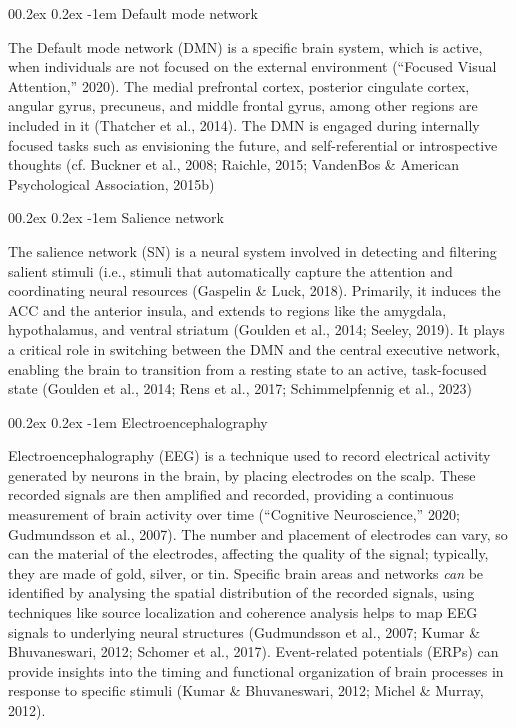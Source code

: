 \documentclass[
  stu, a4paper,floatsintext]{apa7}
\makeatletter
\let\oldparagraph\paragraph
\renewcommand{\paragraph}[1]{\oldparagraph{#1}\mbox{}}
\renewcommand{\paragraph}{\@startsection{paragraph}{4}{\parindent}%
  {0\baselineskip \@plus 0.2ex \@minus 0.2ex}%
  {-1em}%
  {\normalfont\normalsize\bfseries\itshape\typesectitle}}
\renewcommand{\paragraph}{\@startsection{paragraph}{4}{\parindent}%
  {0\baselineskip \@plus 0.2ex \@minus 0.2ex}%
  {-1em}%
  {\normalfont\normalsize\bfseries\typesectitle}}
\makeatother
\begin{document}
\paragraph{Default mode network}\label{default-mode-network}

The Default mode network (DMN) is a specific brain system, which is active, when individuals are not focused on the external environment ({``Focused Visual Attention,''} 2020).
The medial prefrontal cortex, posterior cingulate cortex, angular gyrus, precuneus, and middle frontal gyrus, among other regions are included in it (Thatcher et al., 2014).
The DMN is engaged during internally focused tasks such as envisioning the future, and self-referential or introspective thoughts (cf. Buckner et al., 2008; Raichle, 2015; VandenBos \& American Psychological Association, 2015b)

\paragraph{Salience network}\label{salience-network}

The salience network (SN) is a neural system involved in detecting and filtering salient stimuli (i.e., stimuli that automatically capture the attention and coordinating neural resources (Gaspelin \& Luck, 2018).
Primarily, it induces the ACC and the anterior insula, and extends to regions like the amygdala, hypothalamus, and ventral striatum (Goulden et al., 2014; Seeley, 2019).
It plays a critical role in switching between the DMN and the central executive network, enabling the brain to transition from a resting state to an active, task-focused state (Goulden et al., 2014; Rens et al., 2017; Schimmelpfennig et al., 2023)

\paragraph{Electroencephalography}\label{electroencephalography}

Electroencephalography (EEG) is a technique used to record electrical activity generated by neurons in the brain, by placing electrodes on the scalp.
These recorded signals are then amplified and recorded, providing a continuous measurement of brain activity over time ({``Cognitive Neuroscience,''} 2020; Gudmundsson et al., 2007).
The number and placement of electrodes can vary, so can the material of the electrodes, affecting the quality of the signal; typically, they are made of gold, silver, or tin.
Specific brain areas and networks \emph{can} be identified by analysing the spatial distribution of the recorded signals, using techniques like source localization and coherence analysis helps to map EEG signals to underlying neural structures (Gudmundsson et al., 2007; Kumar \& Bhuvaneswari, 2012; Schomer et al., 2017).
Event-related potentials (ERPs) can provide insights into the timing and functional organization of brain processes in response to specific stimuli (Kumar \& Bhuvaneswari, 2012; Michel \& Murray, 2012).
\end{document}
